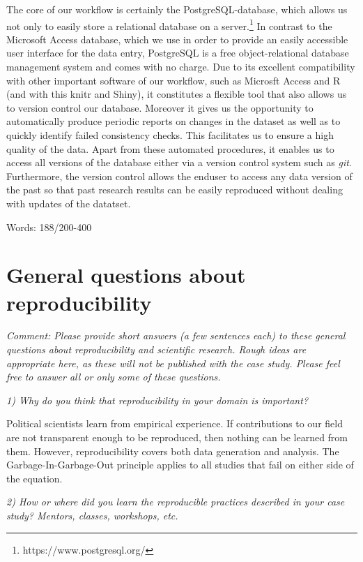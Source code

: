 \documentclass[
  11pt
]{article}
\begin{document}
\vspace*{1cm}

\noindent
The core of our workflow is certainly the PostgreSQL-database, which allows us not only to easily store a relational database on a server.\footnote{https://www.postgresql.org/} In contrast to the Microsoft Access database, which we use in order to provide an easily accessible user interface for the data entry, PostgreSQL is a free object-relational database management system and comes with no charge. Due to its excellent compatibility with other important software of our workflow, such as Microsft Access and R (and with this knitr and Shiny), it constitutes a flexible tool that also allows us to version control our database. Moreover it gives us the opportunity to automatically produce periodic reports on changes in the dataset as well as to quickly identify failed consistency checks. This facilitates us to ensure a high  quality of the data. Apart from these automated procedures, it enables us to access all versions of the database either via a version control system such as \textit{git}. Furthermore, the version control allows the enduser to access any data version of the past so that past research results can be easily reproduced without dealing with updates of the datatset.

\vspace*{1cm}
\noindent
Words:  188/200-400

\section{General questions about reproducibility}

\textit{Comment: Please provide short answers (a few sentences each) to these general questions about reproducibility and scientific research. Rough ideas are appropriate here, as these will not be published with the case study. Please feel free to answer all or only some of these questions.}

\noindent
\textit{1) Why do you think that reproducibility in your domain is important?}

Political scientists learn from empirical experience. If
contributions to our field are not transparent enough to be
reproduced, then nothing can be learned from them. However, 
reproducibility covers both data generation and analysis.
The Garbage-In-Garbage-Out principle applies to all studies
that fail on either side of the equation.  

\textit{2) How or where did you learn the reproducible practices described in your case study? Mentors, classes, workshops, etc.}
\end{document}
